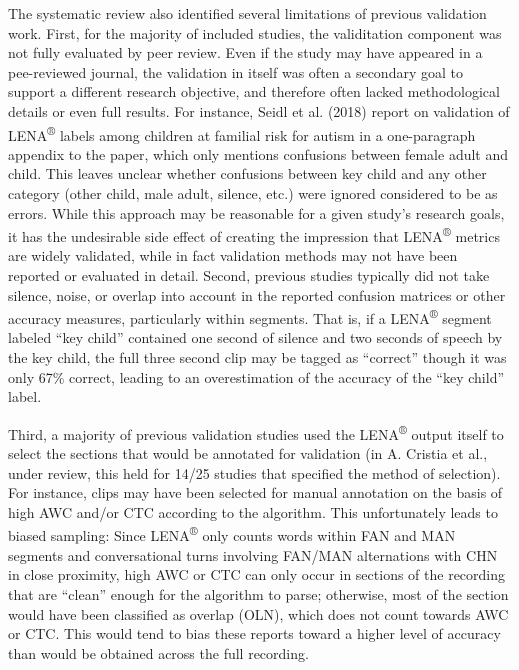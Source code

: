 \documentclass[english,floatsintext,man]{apa6}
\begin{document}
The systematic review also identified several limitations of previous
validation work. First, for the majority of included studies, the
validitation component was not fully evaluated by peer review. Even if
the study may have appeared in a pee-reviewed journal, the validation in
itself was often a secondary goal to support a different research
objective, and therefore often lacked methodological details or even
full results. For instance, Seidl et al. (2018) report on validation of
LENA\textsuperscript{®} labels among children at familial risk for
autism in a one-paragraph appendix to the paper, which only mentions
confusions between female adult and child. This leaves unclear whether
confusions between key child and any other category (other child, male
adult, silence, etc.) were ignored considered to be as errors. While
this approach may be reasonable for a given study's research goals, it
has the undesirable side effect of creating the impression that
LENA\textsuperscript{®} metrics are widely validated, while in fact
validation methods may not have been reported or evaluated in detail.
Second, previous studies typically did not take silence, noise, or
overlap into account in the reported confusion matrices or other
accuracy measures, particularly within segments. That is, if a
LENA\textsuperscript{®} segment labeled \enquote{key child} contained
one second of silence and two seconds of speech by the key child, the
full three second clip may be tagged as \enquote{correct} though it was
only 67\% correct, leading to an overestimation of the accuracy of the
\enquote{key child} label.

Third, a majority of previous validation studies used the
LENA\textsuperscript{®} output itself to select the sections that would
be annotated for validation (in A. Cristia et al., under review, this
held for 14/25 studies that specified the method of selection). For
instance, clips may have been selected for manual annotation on the
basis of high AWC and/or CTC according to the algorithm. This
unfortunately leads to biased sampling: Since LENA\textsuperscript{®}
only counts words within FAN and MAN segments and conversational turns
involving FAN/MAN alternations with CHN in close proximity, high AWC or
CTC can only occur in sections of the recording that are \enquote{clean}
enough for the algorithm to parse; otherwise, most of the section would
have been classified as overlap (OLN), which does not count towards AWC
or CTC. This would tend to bias these reports toward a higher level of
accuracy than would be obtained across the full recording.
\end{document}
